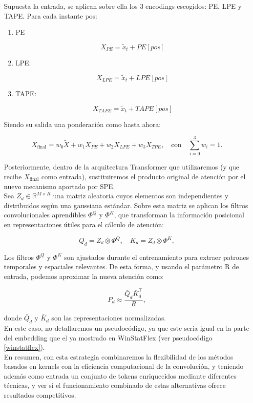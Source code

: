 Supuesta la entrada, se aplican sobre ella los 3 encodings escogidos: PE, LPE y TAPE. Para cada instante pos:

\begin{enumerate}
	\item PE

	$$
	X_{PE} = \tilde{x}_t + PE[pos]
	$$
	\item LPE:
	

	$$
	X_{LPE} = \tilde{x}_t + LPE[pos]
	$$
	
	\item TAPE:
	
	$$
	X_{TAPE} = \tilde{x}_t + TAPE[pos]
	$$
	
\end{enumerate}


Siendo su salida una ponderación como hasta ahora:

$$
X_{\text{final}} = w_0 \tilde{X} + w_1 X_{PE} + w_2 X_{LPE} + w_3 X_{TPE}, \quad \text{con} \quad \sum_{i=0}^3 w_i = 1.
$$

Posteriormente, dentro de la arquitectura Transformer que utilizaremos (y que recibe \(X_{\text{final}}\) como entrada), sustituiremos el producto original de atención por el nuevo mecanismo aportado por SPE.\\

Sea \(Z_d \in \mathbb{R}^{M \times R}\) una matriz aleatoria cuyos elementos son independientes y distribuidos según una gaussiana estándar. Sobre esta matriz se aplican los filtros convolucionales aprendibles \(\Phi^Q\) y \(\Phi^K\), que transforman la información posicional en representaciones útiles para el cálculo de atención:

\[
Q_d = Z_d \otimes \Phi^Q, \quad K_d = Z_d \otimes \Phi^K,
\]

Los filtros \(\Phi^Q\) y \(\Phi^K\) son ajustados durante el entrenamiento para extraer patrones temporales y espaciales relevantes. De esta forma, y usando el parámetro R de entrada, podemos aproximar la nueva atención como:

\[
P_d \approx \frac{\bar{Q}_d \bar{K}_d^\top}{R},
\]

donde \(\bar{Q}_d\) y \(\bar{K}_d\) son las representaciones normalizadas.\\

En este caso, no detallaremos un pseudocódigo, ya que este sería igual en la parte del embedding que el ya mostrado en WinStatFlex (ver pseudocódigo \ref{winstatflex}).\\

En resumen, con esta estrategia combinaremos la flexibilidad de los métodos basados en kernels con la eficiencia computacional de la convolución, y teniendo además como entrada un conjunto de tokens enriquecidos mediante diferentes técnicas, y ver si el funcionamiento combinado de estas alternativas ofrece resultados competitivos.